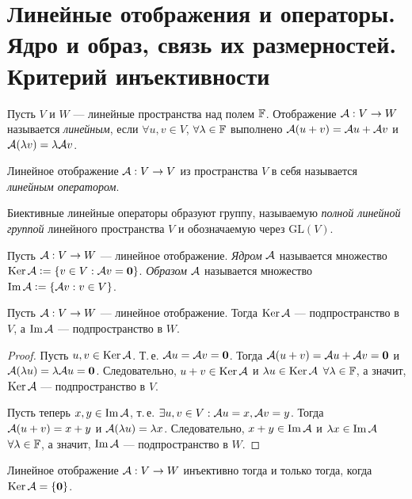 \section{Линейные отображения и операторы. Ядро и образ, связь их размерностей. Критерий инъективности}

\begin{definition}
    Пусть $V$ и $W$ --- линейные пространства над полем $\mathbb{F}$. Отображение $\mathcal{A}: V \to W$ называется \textit{линейным}, если $\forall u, v \in V$, $\forall \lambda \in \mathbb{F}$ выполнено $\mathcal{A}(u + v) = \mathcal{A} u + \mathcal{A} v$ и $\mathcal{A}(\lambda v) = \lambda\mathcal{A} v$.
\end{definition}

\begin{definition}
    Линейное отображение $\mathcal{A}: V \to V$ из пространства $V$ в себя называется \textit{линейным оператором}.
\end{definition}

Биективные линейные операторы образуют группу, называемую \textit{полной линейной группой} линейного пространства $V$ и обозначаемую через $\mathrm{GL}(V)$.

\begin{definition}
    Пусть $\mathcal{A}: V \to W$ --- линейное отображение. \textit{Ядром} $\mathcal{A}$ называется множество $\operatorname{Ker}\mathcal{A} \vcentcolon = \{v \in V : \mathcal{A} v = \boldsymbol{0}\}$. \textit{Образом} $\mathcal{A}$ называется множество $\operatorname{Im} \mathcal{A} \vcentcolon = \{\mathcal{A} v : v \in V\}$.
\end{definition}

\begin{proposal}
    Пусть $\mathcal{A}: V \to W$ --- линейное отображение. Тогда $\operatorname{Ker} \mathcal{A}$ --- подпространство в $V$, а $\operatorname{Im}\mathcal{A}$ --- подпространство в $W$.
\end{proposal}

\begin{proof}
    Пусть $u, v \in \operatorname{Ker}\mathcal{A}$. Т.\,е. $\mathcal{A} u = \mathcal{A} v = \boldsymbol{0}$. Тогда $\mathcal{A}(u + v) = \mathcal{A} u + \mathcal{A} v = \boldsymbol{0}$ и $\mathcal{A}(\lambda u) = \lambda\mathcal{A} u = \boldsymbol{0}$. Следовательно, $u + v \in \operatorname{Ker}\mathcal{A}$ и $\lambda u \in \operatorname{Ker} \mathcal{A}$ $\forall \lambda \in \mathbb{F}$, а значит, $\operatorname{Ker}\mathcal{A}$ --- подпространство в $V$.

    Пусть теперь $x, y \in \operatorname{Im}\mathcal{A}$, т.\,е. $\exists u, v \in V: \mathcal{A} u = x, \mathcal{A} v = y$. Тогда $\mathcal{A}(u + v) = x + y$ и $\mathcal{A}(\lambda u) = \lambda x$. Следовательно, $x + y \in \operatorname{Im}\mathcal{A}$ и $\lambda x \in \operatorname{Im}\mathcal{A}$ $\forall \lambda \in \mathbb{F}$, а значит, $\operatorname{Im}\mathcal{A}$ --- подпространство в $W$.
\end{proof}

\begin{lemma}
    Линейное отображение $\mathcal{A}: V \to W$ инъективно тогда и только тогда, когда $\operatorname{Ker}\mathcal{A} = \{\boldsymbol{0}\}$.
\end{lemma}

